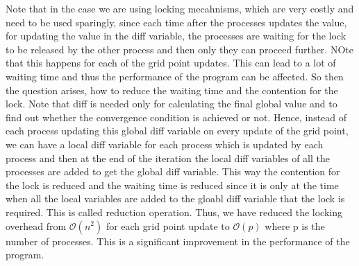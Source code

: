 \documentclass[12pt]{article}
\begin{document}
Note that in the case we are using locking mecahnisms, which are very costly and need to be used sparingly,
since each time after the processes updates the value, for updating the value in the diff variable, the processes are waiting for the lock to be released by the other process and then only they can proceed further. 
NOte that this happens for each of the grid point updates. 
This can lead to a lot of waiting time and thus the performance of the program can be affected.
So then the question arises, how to reduce the waiting time and the contention for the lock.
Note that diff is needed only for calculating the final global value and to find out whether the convergence condition is achieved or not.
Hence, instead of each process updating this global diff variable on every update of the grid point, we can have a local diff variable for each process which is updated by each process and then at the end of the iteration
the local diff variables of all the processes are added to get the global diff variable. This way the contention for the lock is reduced and the waiting time is reduced since it is only at the time when all the
local variables are added to the gloabl diff variable that the lock is required. This is called reduction operation. Thus, we have reduced the locking overhead from $\mathcal{O}(n^2)$ for each grid point 
update to $\mathcal{O}(p)$ where p is the number of processes. This is a significant improvement in the performance of the program.
\end{document}
